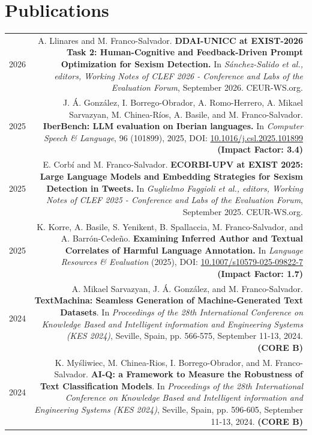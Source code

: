 \documentclass[10pt]{article}
\begin{document}
\section*{Publications}
\begin{tabular}{L!{\VRule}R}
    2026 & A. Llinares and M. Franco-Salvador. \textbf{DDAI-UNICC at EXIST-2026 Task 2: Human-Cognitive and Feedback-Driven Prompt Optimization for Sexism Detection.}
	In \emph{Sánchez-Salido et al., editors, Working Notes of CLEF 2026 - Conference and Labs of the Evaluation Forum}, September 2026. CEUR-WS.org. \vspace{5pt}\\
    2025 & J. Á. González, I. Borrego-Obrador, A. Romo-Herrero, A. Mikael Sarvazyan, M. Chinea-Ríos, A. Basile, and M. Franco-Salvador. \textbf{IberBench: LLM evaluation on Iberian languages.}
	In \emph{Computer Speech \& Language}, 96 (101899), 2025, DOI: \href{https://doi.org/10.1016/j.csl.2025.101899}{10.1016/j.csl.2025.101899} \textbf{(Impact Factor: 3.4)} \vspace{5pt}\\
    2025 & E. Corbí and M. Franco-Salvador. \textbf{ECORBI-UPV at EXIST 2025: Large Language Models and Embedding Strategies for Sexism Detection in Tweets.}
	In \emph{Guglielmo Faggioli et al., editors, Working Notes of CLEF 2025 - Conference and Labs of the Evaluation Forum}, September 2025. CEUR-WS.org. \vspace{5pt}\\
    2025 & K. Korre, A. Basile, S. Yenikent, B. Spallaccia, M. Franco-Salvador, and A. Barrón-Cedeño. \textbf{Examining Inferred Author and Textual Correlates of Harmful Language Annotation.}
	In \emph{Language Resources \& Evaluation} (2025), DOI: \href{https://doi.org/10.1007/s10579-025-09822-7}{10.1007/s10579-025-09822-7} \textbf{(Impact Factor: 1.7)} \vspace{5pt}\\
    2024 & A. Mikael Sarvazyan, J. Á. González, and M. Franco-Salvador. \textbf{TextMachina: Seamless Generation of Machine-Generated Text Datasets}. In \emph{Proceedings of the 28th International Conference on Knowledge Based and Intelligent information and Engineering Systems (KES 2024)}, Seville, Spain, pp. 566-575, September 11-13, 2024. \textbf{(CORE B)} \vspace{5pt}\\
    2024 & K. My{\'s}liwiec, M. Chinea-Rios, I. Borrego-Obrador, and M. Franco-Salvador. \textbf{AI-Q: a Framework to Measure the Robustness of Text Classification Models}. In \emph{Proceedings of the 28th International Conference on Knowledge Based and Intelligent information and Engineering Systems (KES 2024)}, Seville, Spain, pp. 596-605, September 11-13, 2024. \textbf{(CORE B)} \vspace{5pt}\\

\end{tabular}
\end{document}
